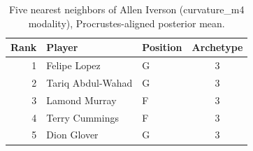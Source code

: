 \begin{table}[htbp]
  \centering\small
  \begin{tabular}{rllc}
    \toprule
    Rank & Player & Position & Archetype \\
    \midrule
    1 & Felipe Lopez & G & 3 \\
    2 & Tariq Abdul-Wahad & G & 3 \\
    3 & Lamond Murray & F & 3 \\
    4 & Terry Cummings & F & 3 \\
    5 & Dion Glover & G & 3 \\
    \bottomrule
  \end{tabular}
  \caption{Five nearest neighbors of Allen Iverson (curvature_m4 modality), Procrustes-aligned posterior mean.}
  \label{tab:Allen_Iverson_neighbors_curvature_m4}
\end{table}

